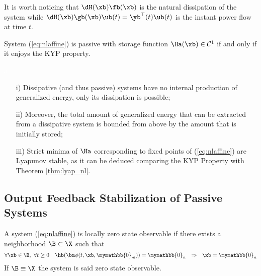 %
It is worth noticing that ${\dH(\xb)}\fb(\xb)$ is the natural dissipation of the system while ${\dH(\xb)}\gb(\xb)\ub(t)=\yb^\top(t)\ub(t)$ is the instant power flow at time $t$.
%
\begin{prop}
    System (\ref{eq:nlaffine}) is passive with storage function $\Ha(\xb)\in \mathcal{C}^1$ if and only if it enjoys the KYP property.
\end{prop}
%
\begin{rem}\textcolor{white}{a}
\begin{itemize}
    \item[i)] Dissipative (and thus passive) systems have no internal production of generalized energy, only its dissipation is possible; 
    \item[ii)] Moreover, the total amount of generalized energy that can be extracted from a dissipative system is bounded from above by the amount that is initially stored; 
    \item[iii)] Strict minima of $\Ha$ corresponding to fixed points of (\ref{eq:nlaffine}) are Lyapunov stable, as it can be deduced comparing the KYP Property with Theorem \ref{thm:lyap_nl}.
\end{itemize}
\end{rem}
%
\subsection{Output Feedback Stabilization of Passive Systems}\label{sec:OutFeedStab}
%
\begin{defn}[Observability]
	A system (\ref{eq:nlaffine}) is locally zero state observable if there exists a neighborhood $\B\subset\X$ such that
	\begin{equation}
	    \forall \xb\in \B,~\forall t\geq 0 \quad \hb(\bm\phi(t,\xb,\mymathbb{0}_m))=\mymathbb{0}_n~~\Rightarrow~~ \xb=\mymathbb{0}_n
	\end{equation}
	If $\B\equiv\X$ the system is said zero state observable.
\end{defn}


